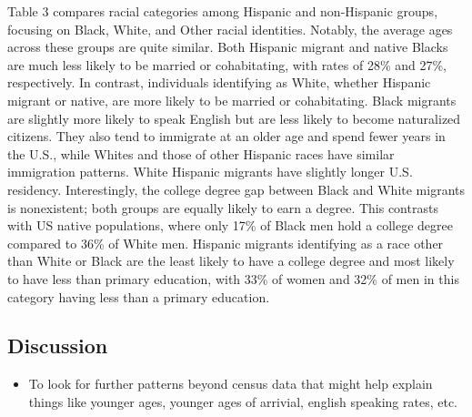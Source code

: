 \documentclass[
]{article}
\providecommand{\tightlist}{%
  \setlength{\itemsep}{0pt}\setlength{\parskip}{0pt}}\usepackage{longtable,booktabs,array}
\begin{document}
Table 3 compares racial categories among Hispanic and non-Hispanic
groups, focusing on Black, White, and Other racial identities. Notably,
the average ages across these groups are quite similar. Both Hispanic
migrant and native Blacks are much less likely to be married or
cohabitating, with rates of 28\% and 27\%, respectively. In contrast,
individuals identifying as White, whether Hispanic migrant or native,
are more likely to be married or cohabitating. Black migrants are
slightly more likely to speak English but are less likely to become
naturalized citizens. They also tend to immigrate at an older age and
spend fewer years in the U.S., while Whites and those of other Hispanic
races have similar immigration patterns. White Hispanic migrants have
slightly longer U.S. residency. Interestingly, the college degree gap
between Black and White migrants is nonexistent; both groups are equally
likely to earn a degree. This contrasts with US native populations,
where only 17\% of Black men hold a college degree compared to 36\% of
White men. Hispanic migrants identifying as a race other than White or
Black are the least likely to have a college degree and most likely to
have less than primary education, with 33\% of women and 32\% of men in
this category having less than a primary education.

\subsection{Discussion}\label{discussion}

\begin{itemize}
\tightlist
\item
  To look for further patterns beyond census data that might help
  explain things like younger ages, younger ages of arrivial, english
  speaking rates, etc.
\end{itemize}
\end{document}

